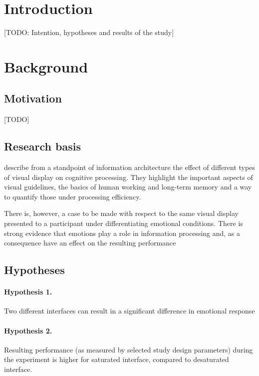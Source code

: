 \clearpage

\section{Introduction}

[TODO: Intention, hypotheses and results of the study]

\clearpage

\section{Background}

	\subsection{Motivation}
	
	[TODO]
	
	
	
		
	\subsection{Research basis} 
	
	\cite{McCrudden2017} describe from a standpoint of information architecture the effect of different types of visual display on cognitive processing. They highlight the important aspects of visual guidelines, the basics of human working and long-term memory and a way to quantify those under processing efficiency.
	
	There is, however, a case to be made with respect to the same visual display presented to a participant under differentiating emotional conditions. There is strong evidence that emotions play a role in information processing and, as a consequence have an effect on the resulting performance
	
	\subsection{Hypotheses}
	
	\paragraph{Hypothesis 1.} Two different interfaces can result in a significant difference in emotional response
	\paragraph{Hypothesis 2.} Resulting performance (as measured by selected study design parameters) during the experiment is higher for saturated interface, compared to desaturated interface.

